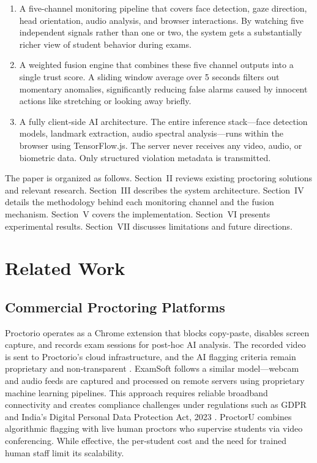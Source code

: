 \documentclass[conference]{IEEEtran}
\begin{document}
\begin{enumerate}
    \item A five-channel monitoring pipeline that covers face detection, gaze direction, head orientation, audio analysis, and browser interactions. By watching five independent signals rather than one or two, the system gets a substantially richer view of student behavior during exams.
    \item A weighted fusion engine that combines these five channel outputs into a single trust score. A sliding window average over 5 seconds filters out momentary anomalies, significantly reducing false alarms caused by innocent actions like stretching or looking away briefly.
    \item A fully client-side AI architecture. The entire inference stack---face detection models, landmark extraction, audio spectral analysis---runs within the browser using TensorFlow.js. The server never receives any video, audio, or biometric data. Only structured violation metadata is transmitted.
\end{enumerate}

The paper is organized as follows. Section~II reviews existing proctoring solutions and relevant research. Section~III describes the system architecture. Section~IV details the methodology behind each monitoring channel and the fusion mechanism. Section~V covers the implementation. Section~VI presents experimental results. Section~VII discusses limitations and future directions.

\section{Related Work}

\subsection{Commercial Proctoring Platforms}

Proctorio \cite{proctorio2023} operates as a Chrome extension that blocks copy-paste, disables screen capture, and records exam sessions for post-hoc AI analysis. The recorded video is sent to Proctorio's cloud infrastructure, and the AI flagging criteria remain proprietary and non-transparent \cite{swauger2020}. ExamSoft \cite{examsoft2023} follows a similar model---webcam and audio feeds are captured and processed on remote servers using proprietary machine learning pipelines. This approach requires reliable broadband connectivity and creates compliance challenges under regulations such as GDPR and India's Digital Personal Data Protection Act, 2023 \cite{dpdpa2023}. ProctorU \cite{proctoru2023} combines algorithmic flagging with live human proctors who supervise students via video conferencing. While effective, the per-student cost and the need for trained human staff limit its scalability.
\end{document}
